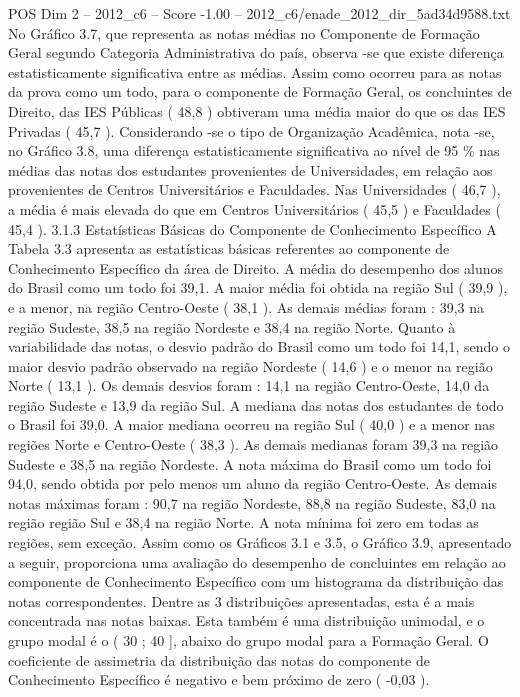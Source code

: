 \begin{textsample}{POS Dim 2 – 2012\_c6 – Score -1.00 – 2012\_c6/enade\_2012\_dir\_5ad34d9588.txt}
No Gráfico 3.7, que representa as notas médias no Componente de Formação Geral segundo Categoria Administrativa do país, observa -se que existe diferença estatisticamente significativa entre as médias.
Assim como ocorreu para as notas da prova como um todo, para o componente de Formação Geral, os concluintes de Direito, das IES Públicas ( 48,8 ) obtiveram uma média maior do que os das IES Privadas ( 45,7 ).
Considerando -se o tipo de Organização Acadêmica, nota -se, no Gráfico 3.8, uma diferença estatisticamente significativa ao nível de 95 \% nas médias das notas dos estudantes provenientes de Universidades, em relação aos provenientes de Centros Universitários e Faculdades.
Nas Universidades ( 46,7 ), a média é mais elevada do que em Centros Universitários ( 45,5 ) e Faculdades ( 45,4 ). 3.1.3 Estatísticas Básicas do Componente de Conhecimento Específico A Tabela 3.3 apresenta as estatísticas básicas referentes ao componente de Conhecimento Específico da área de Direito.
A média do desempenho dos alunos do Brasil como um todo foi 39,1.
A maior média foi obtida na região Sul ( 39,9 ), e a menor, na região Centro-Oeste ( 38,1 ).
As demais médias foram : 39,3 na região Sudeste, 38,5 na região Nordeste e 38,4 na região Norte.
Quanto à variabilidade das notas, o desvio padrão do Brasil como um todo foi 14,1, sendo o maior desvio padrão observado na região Nordeste ( 14,6 ) e o menor na região Norte ( 13,1 ).
Os demais desvios foram : 14,1 na região Centro-Oeste, 14,0 da região Sudeste e 13,9 da região Sul.
A mediana das notas dos estudantes de todo o Brasil foi 39,0.
A maior mediana ocorreu na região Sul ( 40,0 ) e a menor nas regiões Norte e Centro-Oeste ( 38,3 ).
As demais medianas foram 39,3 na região Sudeste e 38,5 na região Nordeste.
A nota máxima do Brasil como um todo foi 94,0, sendo obtida por pelo menos um aluno da região Centro-Oeste.
As demais notas máximas foram : 90,7 na região Nordeste, 88,8 na região Sudeste, 83,0 na região região Sul e 38,4 na região Norte.
A nota mínima foi zero em todas as regiões, sem exceção.
Assim como os Gráficos 3.1 e 3.5, o Gráfico 3.9, apresentado a seguir, proporciona uma avaliação do desempenho de concluintes em relação ao componente de Conhecimento Específico com um histograma da distribuição das notas correspondentes.
Dentre as 3 distribuições apresentadas, esta é a mais concentrada nas notas baixas.
Esta também é uma distribuição unimodal, e o grupo modal é o ( 30 ; 40 ], abaixo do grupo modal para a Formação Geral.
O coeficiente de assimetria da distribuição das notas do componente de Conhecimento Específico é negativo e bem próximo de zero ( -0,03 ).

\end{textsample}

